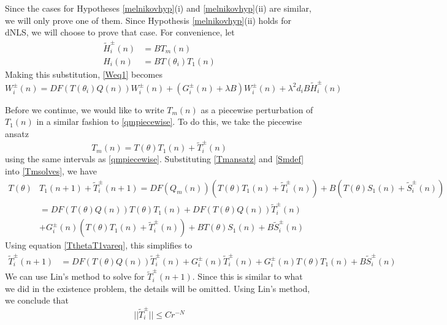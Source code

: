 \documentclass[12pt]{article}
\begin{document}
Since the cases for Hypotheses \ref{melnikovhyp}(i) and \ref{melnikovhyp}(ii) are similar, we will only prove one of them. Since Hypothesis \ref{melnikovhyp}(ii) holds for dNLS, we will choose to prove that case. For convenience, let
\begin{align*}
\tilde{H}_i^\pm(n) &= B T_m(n) \\
H_i(n) &= B T(\theta_i) T_1(n)
\end{align*}
Making this substitution, \eqref{Weq1} becomes
\begin{equation}\label{Weq2}
W_i^\pm(n) = DF(T(\theta_i) Q(n) ) W_i^\pm(n) + (G_i^\pm(n) + \lambda B) W_i^\pm(n) + \lambda^2 d_i B \tilde{H}_i^\pm(n)
\end{equation}

Before we continue, we would like to write $T_m(n)$ as a piecewise perturbation of $T_1(n)$ in a similar fashion to \eqref{qmpiecewise}. To do this, we take the piecewise ansatz 
\begin{equation}\label{Tmansatz}
T_m(n) = T(\theta)T_1(n) + \tilde{T}_i^\pm(n)
\end{equation}
using the same intervals as \eqref{qmpiecewise}. Substituting \eqref{Tmansatz} and \eqref{Smdef} into \eqref{Tmsolves}, we have
\begin{align*}
T(\theta)&T_1(n+1) + \tilde{T}_i^\pm(n+1) = DF(Q_m(n)) (T(\theta)T_1(n) + \tilde{T}_i^\pm(n)) + B (T(\theta)S_1(n) + \tilde{S}_i^\pm(n)) \\
&= DF(T(\theta)Q(n)) T(\theta)T_1(n) + DF(T(\theta)Q(n)) \tilde{T}_i^\pm(n) \\
&+ G_i^\pm(n)(T(\theta)T_1(n) + \tilde{T}_i^\pm(n)) + B T(\theta)S_1(n) + B \tilde{S}_i^\pm(n)
\end{align*}
Using equation \eqref{TthetaT1vareq}, this simplifies to
\begin{align*}
\tilde{T}_i^\pm(n+1) 
&= DF(T(\theta)Q(n)) \tilde{T}_i^\pm(n)
+ G_i^\pm(n) \tilde{T}_i^\pm(n) + G_i^\pm(n) T(\theta)T_1(n) + B \tilde{S}_i^\pm(n)
\end{align*}
We can use Lin's method to solve for $\tilde{T}_i^\pm(n+1)$. Since this is similar to what we did in the existence problem, the details will be omitted. Using Lin's method, we conclude that
\begin{equation}\label{Tipmbound}
|| \tilde{T}_i^\pm || \leq C r^{-N}
\end{equation}
\end{document}
